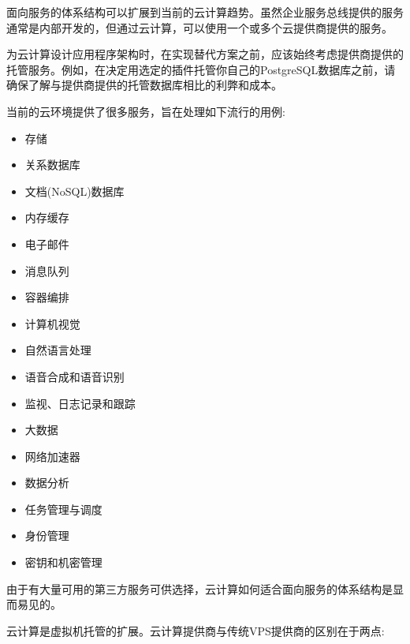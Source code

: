 
面向服务的体系结构可以扩展到当前的云计算趋势。虽然企业服务总线提供的服务通常是内部开发的，但通过云计算，可以使用一个或多个云提供商提供的服务。

为云计算设计应用程序架构时，在实现替代方案之前，应该始终考虑提供商提供的托管服务。例如，在决定用选定的插件托管你自己的PostgreSQL数据库之前，请确保了解与提供商提供的托管数据库相比的利弊和成本。

当前的云环境提供了很多服务，旨在处理如下流行的用例:

\begin{itemize}
\item 
存储

\item 
关系数据库

\item 
文档(NoSQL)数据库

\item 
内存缓存

\item 
电子邮件

\item 
消息队列

\item 
容器编排

\item 
计算机视觉

\item 
自然语言处理

\item 
语音合成和语音识别

\item 
监视、日志记录和跟踪

\item 
大数据

\item 
网络加速器

\item 
数据分析

\item 
任务管理与调度

\item 
身份管理

\item 
密钥和机密管理
\end{itemize}

由于有大量可用的第三方服务可供选择，云计算如何适合面向服务的体系结构是显而易见的。


云计算是虚拟机托管的扩展。云计算提供商与传统VPS提供商的区别在于两点:

